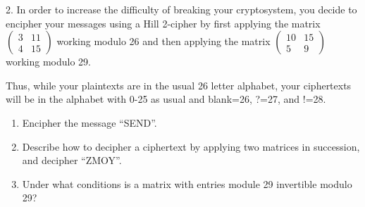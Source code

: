 2. In order to increase the difficulty of breaking your cryptosystem, you decide to encipher your messages using a Hill 2-cipher by first applying the matrix $\begin{pmatrix} 3&11\\4&15 \end{pmatrix}$ working modulo 26 and then applying the matrix $\begin{pmatrix} 10&15\\5&9 \end{pmatrix} $ working modulo 29.

Thus, while your plaintexts are in the usual 26 letter alphabet, your ciphertexts will be in the alphabet with 0-25 as usual and blank=26, ?=27, and !=28.

\begin{enumerate}[label=\alph*)]
  \item Encipher the message “SEND”.
  \item Describe how to decipher a ciphertext by applying two matrices in succession, and decipher “ZMOY”.
  \item Under what conditions is a matrix with entries module 29 invertible modulo 29?
\end{enumerate}
